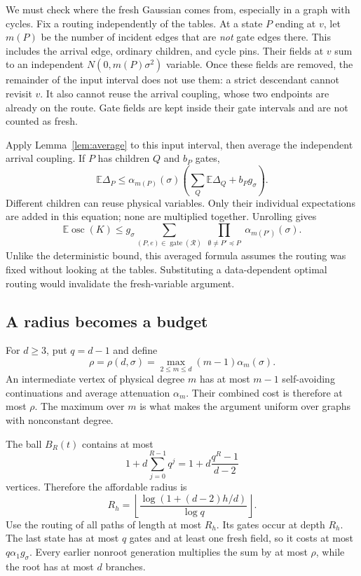 \documentclass[11pt]{article}
\theoremstyle{definition}
\theoremstyle{remark}
\DeclareMathOperator{\osc}{osc}
\newcommand{\E}{\mathbb E}
\newcommand{\routing}{\mathcal R}
\begin{document}
We must check where the fresh Gaussian comes from, especially in a graph
with cycles. Fix a routing independently of the tables. At a state $P$
ending at $v$, let $m(P)$ be the number of incident edges that are
\emph{not} gate edges there. This includes the arrival edge, ordinary
children, and cycle pins. Their fields at $v$ sum to an independent
$N(0,m(P)\sigma^2)$ variable. Once these fields are removed, the remainder
of the input interval does not use them: a strict descendant cannot revisit
$v$. It also cannot reuse the arrival coupling, whose two endpoints are
already on the route. Gate fields are kept inside their gate intervals
and are not counted as fresh.

Apply Lemma~\ref{lem:average} to this input interval, then average the
independent arrival coupling. If $P$ has children $Q$ and $b_P$ gates,
\begin{equation}
 \E\Delta_P\le\alpha_{m(P)}(\sigma)
       \left(\sum_Q\E\Delta_Q+b_Pg_\sigma\right).
 \label{eq:mean-recursion}
\end{equation}
Different children can reuse physical variables. Only their individual
expectations are added in this equation; none are multiplied together.
Unrolling gives
\begin{equation}
 \E\osc(K)\le g_\sigma
 \sum_{(P,e)\in\operatorname{gate}(\routing)}
       \prod_{\substack{\emptyset\ne P'\preceq P}}
                      \alpha_{m(P')}(\sigma).
 \label{eq:mean-routing}
\end{equation}
Unlike the deterministic bound, this averaged formula assumes the routing
was fixed without looking at the tables. Substituting a data-dependent
optimal routing would invalidate the fresh-variable argument.

\subsection{A radius becomes a budget}
For $d\ge3$, put $q=d-1$ and define
\begin{equation}
 \rho=\rho(d,\sigma)=\max_{2\le m\le d}(m-1)\alpha_m(\sigma).
 \label{eq:rho}
\end{equation}
An intermediate vertex of physical degree $m$ has at most $m-1$
self-avoiding continuations and average attenuation $\alpha_m$.
Their combined cost is therefore at most $\rho$. The maximum over $m$
is what makes the argument uniform over graphs with nonconstant degree.

The ball $B_R(t)$ contains at most
\[
 1+d\sum_{j=0}^{R-1}q^j=1+d\frac{q^R-1}{d-2}
\]
vertices. Therefore the affordable radius is
\begin{equation}
 R_h=\left\lfloor\frac{\log(1+(d-2)h/d)}{\log q}\right\rfloor.
 \label{eq:radius}
\end{equation}
Use the routing of all paths of length at most $R_h$. Its gates occur
at depth $R_h$. The last state has at most $q$ gates and at least one
fresh field, so it costs at most $q\alpha_1g_\sigma$. Every earlier
nonroot generation multiplies the sum by at most $\rho$, while the root
has at most $d$ branches.
\end{document}
